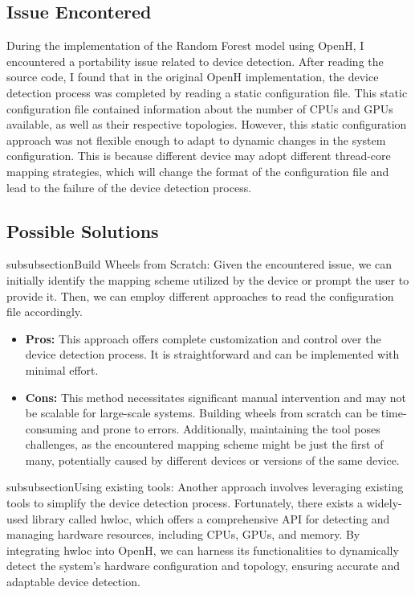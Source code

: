 \documentclass[13pt]{article}
\begin{document}
\subsection{Issue Encontered}
During the implementation of the Random Forest model using OpenH, I encountered a portability issue related to device detection.
After reading the source code, I found that in the original OpenH implementation, the device detection process was completed by reading a static configuration file. 
This static configuration file contained information about the number of CPUs and GPUs available, as well as their respective topologies. 
However, this static configuration approach was not flexible enough to adapt to dynamic changes in the system configuration. 
This is because different device may adopt different thread-core mapping strategies, which will change the format of the configuration file and lead to the failure of the device detection process.

\subsection{Possible Solutions}
subsubsection{Build Wheels from Scratch:}
Given the encountered issue, we can initially identify the mapping scheme utilized by the device or prompt the user to provide it. Then, we can employ different approaches to read the configuration file accordingly.
\begin{itemize}
    \item \textbf{Pros:}
    This approach offers complete customization and control over the device detection process. It is straightforward and can be implemented with minimal effort.
    \item \textbf{Cons:}
    This method necessitates significant manual intervention and may not be scalable for large-scale systems. Building wheels from scratch can be time-consuming and prone to errors. 
    Additionally, maintaining the tool poses challenges, as the encountered mapping scheme might be just the first of many, potentially caused by different devices or versions of the same device.
\end{itemize}

subsubsection{Using existing tools:}
Another approach involves leveraging existing tools to simplify the device detection process. 
Fortunately, there exists a widely-used library called hwloc, which offers a comprehensive API for detecting and managing hardware resources, including CPUs, GPUs, and memory. 
By integrating hwloc into OpenH, we can harness its functionalities to dynamically detect the system's hardware configuration and topology, ensuring accurate and adaptable device detection.
\end{document}
